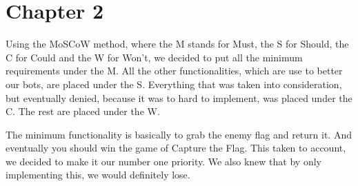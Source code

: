 \chapter{Chapter 2}
Using the MoSCoW method, where the M stands for Must, the S for Should, the C for Could and the W for Won't, we decided to put all the minimum requirements under the M. All the other functionalities, which are use to better our bots, are placed under the S. Everything that was taken into consideration, but eventually denied, because it was to hard to implement, was placed under the C. The rest are placed under the W.

The minimum functionality is basically to grab the enemy flag and return it. And eventually you should win the game of Capture the Flag. This taken to account, we decided to make it our number one priority. We also knew that by only implementing this, we would definitely lose. 